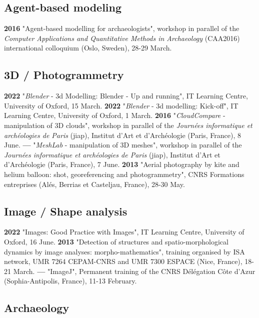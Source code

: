 \documentclass{article}
\begin{document}
\subsection*{Agent-based modeling}

\textbf{2016 }"Agent-based modelling for archaeologists", workshop in parallel of the \textit{Computer Applications and Quantitative Methods in Archaeology} (CAA2016) international colloquium (Oslo, Sweden), 28-29 March.

\subsection*{3D / Photogrammetry}

\textbf{2022 }"\textit{Blender} - 3d Modelling: Blender - Up and running", IT Learning Centre, University of Oxford, 15 March.
\smallbreak
\textbf{2022 }"\textit{Blender} - 3d modelling: Kick-off", IT Learning Centre, University of Oxford, 1 March.
\smallbreak
\textbf{2016 }"\textit{CloudCompare} - manipulation of 3D clouds", workshop in parallel of the \textit{Journ\'{e}es informatique et arch\'{e}ologies de Paris} (jiap), Institut d'Art et d'Arch\'{e}ologie (Paris, France), 8 June.
\smallbreak
\textbf{--- }"\textit{MeshLab }- manipulation of 3D meshes", workshop in parallel of the \textit{Journ\'{e}es informatique et arch\'{e}ologies de Paris} (jiap), Institut d'Art et d'Arch\'{e}ologie (Paris, France), 7 June.
\smallbreak
\textbf{2013 }"Aerial photography by kite and helium balloon: shot, georeferencing and photogrammetry", CNRS Formations entreprises (Al\'{e}s, Berrias et Casteljau, France), 28-30 May.

\subsection*{Image / Shape analysis}

\textbf{2022 }"Images: Good Practice with Images", IT Learning Centre, University of Oxford, 16 June.
\smallbreak
\textbf{2013 }"Detection of structures and spatio-morphological dynamics by image analyses: morpho-mathematics", training organised by ISA network, UMR 7264 CEPAM-CNRS and UMR 7300 ESPACE (Nice, France), 18-21 March.
\smallbreak
\textbf{--- }"ImageJ", Permanent training of the CNRS D\'{e}l\'{e}gation C\^{o}te d'Azur (Sophia-Antipolis, France), 11-13 February.

\subsection*{Archaeology}
\end{document}
